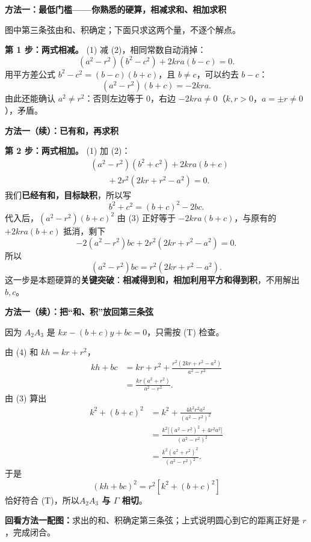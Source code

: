 \clearpage
\begin{proofbox}
\textbf{方法一：最低门槛——你熟悉的硬算，相减求和、相加求积}

\begin{center}

\end{center}
图中第三条弦由和、积确定；下面只求这两个量，不逐个解点。

\textbf{第 1 步：两式相减。} (1) 减 (2)，相同常数自动消掉：
\[
(a^2-r^2)(b^2-c^2)+2kra(b-c)=0.
\]
用平方差公式 $b^2-c^2=(b-c)(b+c)$，且 $b\ne c$，可以约去 $b-c$：
\begin{equation}
\boxed{(a^2-r^2)(b+c)=-2kra.}\tag{3}
\end{equation}
由此还能确认 $a^2\ne r^2$：否则左边等于 $0$，右边 $-2kra\ne0$（$k,r>0$，$a=\pm r\ne0$），矛盾。

\end{proofbox}
\clearpage
\begin{proofbox}
\textbf{方法一（续）：已有和，再求积}

\textbf{第 2 步：两式相加。} (1) 加 (2)：
\[
\begin{aligned}
&(a^2-r^2)(b^2+c^2)+2kra(b+c)\\
&\qquad+2r^2(2kr+r^2-a^2)=0.
\end{aligned}
\]
我们\textbf{已经有和，目标缺积}，所以写
\[
\boxed{b^2+c^2=(b+c)^2-2bc}.
\]
代入后，$ (a^2-r^2)(b+c)^2 $ 由 (3) 正好等于 $-2kra(b+c)$，与原有的 $+2kra(b+c)$ 抵消，剩下
\[
-2(a^2-r^2)bc+2r^2(2kr+r^2-a^2)=0.
\]
所以
\begin{equation}
\boxed{(a^2-r^2)bc=r^2(2kr+r^2-a^2).}\tag{4}
\end{equation}
这一步是本题硬算的\textbf{关键突破}：\textbf{相减得到和，相加利用平方和得到积}，不用解出 $b,c$。
\end{proofbox}

\clearpage
\begin{proofbox}
\textbf{方法一（续）：把“和、积”放回第三条弦}

因为 $A_2A_3$ 是 $kx-(b+c)y+bc=0$，只需按 (T) 检查。

由 (4) 和 $kh=kr+r^2$，
\[
\begin{aligned}
kh+bc&=kr+r^2+\frac{r^2(2kr+r^2-a^2)}{a^2-r^2}\\
&=\frac{kr(a^2+r^2)}{a^2-r^2}.
\end{aligned}
\]
由 (3) 算出
\[
\begin{aligned}
k^2+(b+c)^2
&=k^2+\frac{4k^2r^2a^2}{(a^2-r^2)^2}\\
&=\frac{k^2\bigl[(a^2-r^2)^2+4r^2a^2\bigr]}{(a^2-r^2)^2}\\
&=\frac{k^2(a^2+r^2)^2}{(a^2-r^2)^2}.
\end{aligned}
\]
于是
\[
\boxed{(kh+bc)^2=r^2[k^2+(b+c)^2]}
\]
恰好符合 (T)，所以\textbf{$A_2A_3$ 与 $\Gamma$ 相切}。

\medskip
\textbf{回看方法一配图：}求出的和、积确定第三条弦；上式说明圆心到它的距离正好是 $r$，完成闭合。
\end{proofbox}

